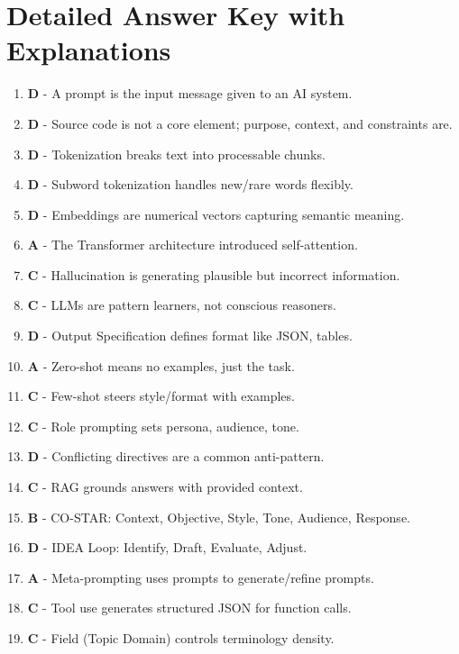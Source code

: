 \documentclass[11pt]{article}
\begin{document}
\vspace{1cm}

\section*{Detailed Answer Key with Explanations}

\begin{enumerate}
    \item \textbf{D} - A prompt is the input message given to an AI system.
    \item \textbf{D} - Source code is not a core element; purpose, context, and constraints are.
    \item \textbf{D} - Tokenization breaks text into processable chunks.
    \item \textbf{D} - Subword tokenization handles new/rare words flexibly.
    \item \textbf{D} - Embeddings are numerical vectors capturing semantic meaning.
    \item \textbf{A} - The Transformer architecture introduced self-attention.
    \item \textbf{C} - Hallucination is generating plausible but incorrect information.
    \item \textbf{C} - LLMs are pattern learners, not conscious reasoners.
    \item \textbf{D} - Output Specification defines format like JSON, tables.
    \item \textbf{A} - Zero-shot means no examples, just the task.
    \item \textbf{C} - Few-shot steers style/format with examples.
    \item \textbf{C} - Role prompting sets persona, audience, tone.
    \item \textbf{D} - Conflicting directives are a common anti-pattern.
    \item \textbf{C} - RAG grounds answers with provided context.
    \item \textbf{B} - CO-STAR: Context, Objective, Style, Tone, Audience, Response.
    \item \textbf{D} - IDEA Loop: Identify, Draft, Evaluate, Adjust.
    \item \textbf{A} - Meta-prompting uses prompts to generate/refine prompts.
    \item \textbf{C} - Tool use generates structured JSON for function calls.
    \item \textbf{C} - Field (Topic Domain) controls terminology density.

\end{enumerate}
\end{document}
